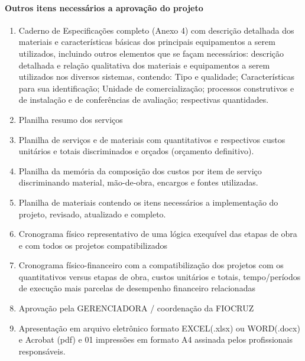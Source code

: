 \paragraph{Outros itens necessários a aprovação do projeto}
\begin{enumerate}

	\item Caderno de Especificações completo (Anexo 4) com descrição detalhada dos materiais e características básicas dos principais equipamentos a serem utilizados, incluindo outros elementos que se façam necessários: descrição detalhada e relação qualitativa dos materiais e equipamentos a serem utilizados nos diversos sistemas, contendo: Tipo e qualidade; Características para sua identificação; Unidade de comercialização; processos construtivos e de instalação e de conferências de avaliação; respectivas quantidades.

	\item Planilha resumo dos serviços

	\item Planilha de serviços e de materiais com quantitativos e respectivos custos unitários e totais discriminados e orçados (orçamento definitivo).

	\item Planilha da memória da composição dos custos por item de serviço discriminando material, mão-de-obra, encargos e fontes utilizadas.

	\item Planilha de materiais contendo os itens necessários a implementação do projeto, revisado, atualizado e completo.

	\item Cronograma físico representativo de uma lógica exequível das etapas de obra e com todos os projetos compatibilizados

	\item Cronograma físico-financeiro com a compatibilização dos projetos com os quantitativos versus etapas de obra, custos unitários e totais, tempo/períodos de execução mais parcelas de desempenho financeiro relacionadas

	\item Aprovação pela GERENCIADORA / coordenação da FIOCRUZ

	\item Apresentação em arquivo eletrônico formato EXCEL(.xlsx) ou WORD(.docx) e Acrobat (pdf) e 01 impressões em formato A4 assinada pelos profissionais responsáveis.

\end{enumerate}

